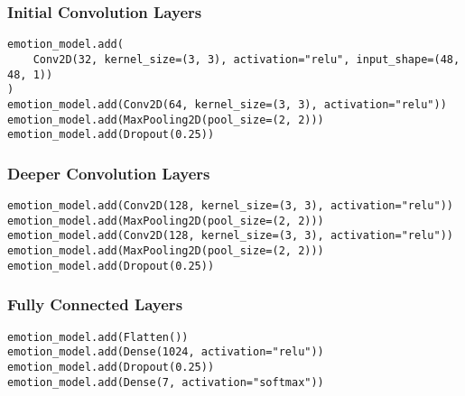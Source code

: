 \documentclass{beamer}
\begin{document}
\begin{frame}[fragile]
	\frametitle{Initial Convolution Layers}
	\begin{verbatim}
emotion_model.add(
    Conv2D(32, kernel_size=(3, 3), activation="relu", input_shape=(48, 48, 1))
)
emotion_model.add(Conv2D(64, kernel_size=(3, 3), activation="relu"))
emotion_model.add(MaxPooling2D(pool_size=(2, 2)))
emotion_model.add(Dropout(0.25))
\end{verbatim}
\end{frame}

\begin{frame}[fragile]
	\frametitle{Deeper Convolution Layers}
	\begin{verbatim}
emotion_model.add(Conv2D(128, kernel_size=(3, 3), activation="relu"))
emotion_model.add(MaxPooling2D(pool_size=(2, 2)))
emotion_model.add(Conv2D(128, kernel_size=(3, 3), activation="relu"))
emotion_model.add(MaxPooling2D(pool_size=(2, 2)))
emotion_model.add(Dropout(0.25))
\end{verbatim}
\end{frame}

\begin{frame}[fragile]
	\frametitle{Fully Connected Layers}
	\begin{verbatim}
emotion_model.add(Flatten())
emotion_model.add(Dense(1024, activation="relu"))
emotion_model.add(Dropout(0.25))
emotion_model.add(Dense(7, activation="softmax"))
\end{verbatim}
\end{frame}
\end{document}
